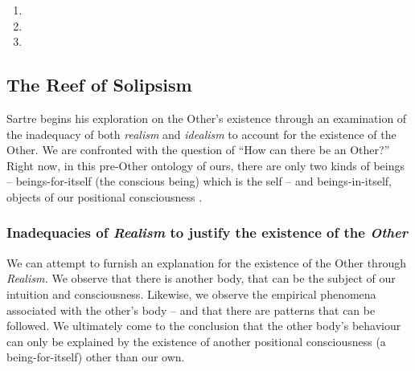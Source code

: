\begin{enumerate}
  \item {}
  \item {}
  \item {}
\end{enumerate}

\subsection{The Reef of Solipsism}

Sartre begins his exploration on the Other's existence \autocite[309 -- 322]{sartre} through an examination of the inadequacy of both \emph{realism} and \emph{idealism} to account for the existence of the Other. We are confronted with the question of \enquote{How can there be an Other?} Right now, in this pre-Other ontology of ours, there are only two kinds of beings -- beings-for-itself (the conscious being) which is the self -- and beings-in-itself, objects of our positional consciousness \autocite[309]{sartre}.

\subsubsection{Inadequacies of \emph{Realism} to justify the existence of the \emph{Other}}

We can attempt to furnish an explanation for the existence of the Other through \emph{Realism.} We observe that there is another body, that can be the subject of our intuition and consciousness. Likewise, we observe the empirical phenomena associated with the other's body -- and that there are patterns that can be followed. We ultimately come to the conclusion that the other body's behaviour can only be explained by the existence of another positional consciousness (a being-for-itself) other than our own. 

